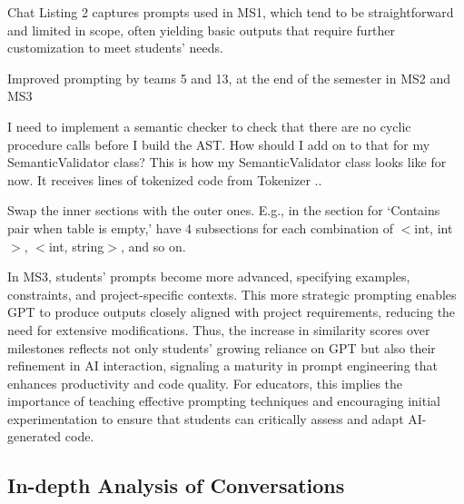 Chat Listing 2 captures prompts used in MS1, which tend to be straightforward and limited in scope, often yielding basic outputs that require further customization to meet students’ needs. 


\begin{chatgroup}{Improved prompting by teams 5 and 13, at the end of the semester in MS2 and MS3}
    \begin{chatbubble}
     \scriptsize
    I need to implement a semantic checker to check that there are no cyclic procedure calls before I build the AST. How should I add on to that for my SemanticValidator class? This is how my SemanticValidator class looks like for now. It receives lines of tokenized code from Tokenizer ..
    \end{chatbubble}
    
    \begin{chatbubble}
     \scriptsize
    Swap the inner sections with the outer ones. E.g., in the section for ‘Contains pair when table is empty,’ have 4 subsections for each combination of $<$int, int$>$, $<$int, string$>$, and so on.
    \end{chatbubble}
\end{chatgroup}

In MS3, students’ prompts become more advanced, specifying examples, constraints, and project-specific contexts. This more strategic prompting enables GPT to produce outputs closely aligned with project requirements, reducing the need for extensive modifications. Thus, the increase in similarity scores over milestones reflects not only students’ growing reliance on GPT but also their refinement in AI interaction, signaling a maturity in prompt engineering that enhances productivity and code quality. 
For educators, this implies the importance of teaching effective prompting techniques and encouraging initial experimentation to ensure that students can critically assess and adapt AI-generated code.

\subsection{In-depth Analysis of Conversations}


